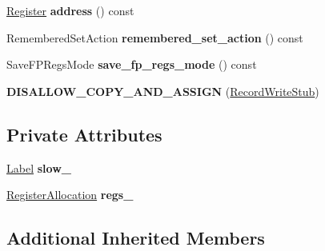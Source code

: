 \begin{DoxyCompactItemize}
\item 
\hyperlink{structv8_1_1internal_1_1_register}{Register} {\bfseries address} () const \hypertarget{classv8_1_1internal_1_1_record_write_stub_a3735e76e5fcb078fcd9f08c519c94d8c}{}\label{classv8_1_1internal_1_1_record_write_stub_a3735e76e5fcb078fcd9f08c519c94d8c}

\item 
Remembered\+Set\+Action {\bfseries remembered\+\_\+set\+\_\+action} () const \hypertarget{classv8_1_1internal_1_1_record_write_stub_ab333b01d325ff4e597af83c7f93bc109}{}\label{classv8_1_1internal_1_1_record_write_stub_ab333b01d325ff4e597af83c7f93bc109}

\item 
Save\+F\+P\+Regs\+Mode {\bfseries save\+\_\+fp\+\_\+regs\+\_\+mode} () const \hypertarget{classv8_1_1internal_1_1_record_write_stub_a958cf062d6f62adc812d2df9b92bd24a}{}\label{classv8_1_1internal_1_1_record_write_stub_a958cf062d6f62adc812d2df9b92bd24a}

\item 
{\bfseries D\+I\+S\+A\+L\+L\+O\+W\+\_\+\+C\+O\+P\+Y\+\_\+\+A\+N\+D\+\_\+\+A\+S\+S\+I\+GN} (\hyperlink{classv8_1_1internal_1_1_record_write_stub}{Record\+Write\+Stub})\hypertarget{classv8_1_1internal_1_1_record_write_stub_ab5fe793d232d0a1fea1b3626df883dd3}{}\label{classv8_1_1internal_1_1_record_write_stub_ab5fe793d232d0a1fea1b3626df883dd3}

\end{DoxyCompactItemize}
\subsection*{Private Attributes}
\begin{DoxyCompactItemize}
\item 
\hyperlink{classv8_1_1internal_1_1_label}{Label} {\bfseries slow\+\_\+}\hypertarget{classv8_1_1internal_1_1_record_write_stub_ad6b48e4dab245e66743fdc7656bd30e6}{}\label{classv8_1_1internal_1_1_record_write_stub_ad6b48e4dab245e66743fdc7656bd30e6}

\item 
\hyperlink{classv8_1_1internal_1_1_record_write_stub_1_1_register_allocation}{Register\+Allocation} {\bfseries regs\+\_\+}\hypertarget{classv8_1_1internal_1_1_record_write_stub_abb1fd68ef9ca8a7f71fd91e95199af8f}{}\label{classv8_1_1internal_1_1_record_write_stub_abb1fd68ef9ca8a7f71fd91e95199af8f}

\end{DoxyCompactItemize}
\subsection*{Additional Inherited Members}


